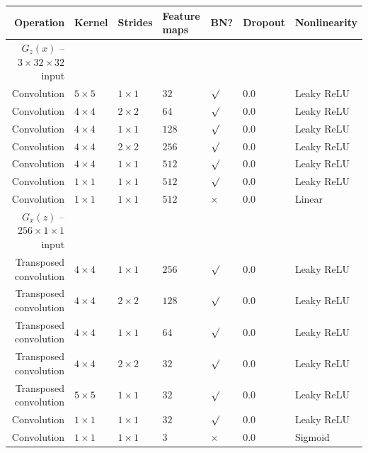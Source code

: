 \documentclass{article}
\begin{document}
\begin{table}[h]
\centering
\begin{tabular}{@{}rllllll@{}} \toprule
Operation              & Kernel       & Strides      & Feature maps & BN?          & Dropout & Nonlinearity \\ \midrule
$G_z(x)$ -- $3 \times 32 \times 32$ input                                                                 \\
Convolution            & $5 \times 5$ & $1 \times 1$ & $32$         & $\surd$      & 0.0     & Leaky ReLU \\
Convolution            & $4 \times 4$ & $2 \times 2$ & $64$         & $\surd$      & 0.0     & Leaky ReLU \\
Convolution            & $4 \times 4$ & $1 \times 1$ & $128$        & $\surd$      & 0.0     & Leaky ReLU \\
Convolution            & $4 \times 4$ & $2 \times 2$ & $256$        & $\surd$      & 0.0     & Leaky ReLU \\
Convolution            & $4 \times 4$ & $1 \times 1$ & $512$        & $\surd$      & 0.0     & Leaky ReLU \\
Convolution            & $1 \times 1$ & $1 \times 1$ & $512$        & $\surd$      & 0.0     & Leaky ReLU \\
Convolution            & $1 \times 1$ & $1 \times 1$ & $512$        & $\times$     & 0.0     & Linear     \\
$G_x(z)$ -- $256 \times 1 \times 1$ input                                                                 \\
Transposed convolution & $4 \times 4$ & $1 \times 1$ & $256$        & $\surd$      & 0.0     & Leaky ReLU \\
Transposed convolution & $4 \times 4$ & $2 \times 2$ & $128$        & $\surd$      & 0.0     & Leaky ReLU \\
Transposed convolution & $4 \times 4$ & $1 \times 1$ & $64$         & $\surd$      & 0.0     & Leaky ReLU \\
Transposed convolution & $4 \times 4$ & $2 \times 2$ & $32$         & $\surd$      & 0.0     & Leaky ReLU \\
Transposed convolution & $5 \times 5$ & $1 \times 1$ & $32$         & $\surd$      & 0.0     & Leaky ReLU \\
Convolution            & $1 \times 1$ & $1 \times 1$ & $32$         & $\surd$      & 0.0     & Leaky ReLU \\
Convolution            & $1 \times 1$ & $1 \times 1$ & $3$          & $\times$     & 0.0     & Sigmoid    \\

\end{tabular}
\end{table}
\end{document}
